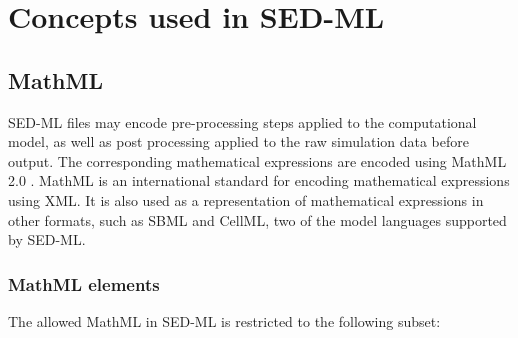 \pagebreak
\section{Concepts used in SED-ML}
\subsection{MathML}
\label{sec:mathML}
SED-ML files may encode pre-processing steps applied to the computational model, as well as post processing applied to the raw simulation data before output. The corresponding mathematical expressions are encoded using MathML 2.0 \citep{CIM+01}. MathML is an international standard for encoding mathematical expressions using XML. It is also used as a representation of mathematical expressions in other formats, such as SBML and CellML, two of the model languages supported by SED-ML. 


\subsubsection{MathML elements}
The allowed MathML in SED-ML is restricted to the following subset: 

